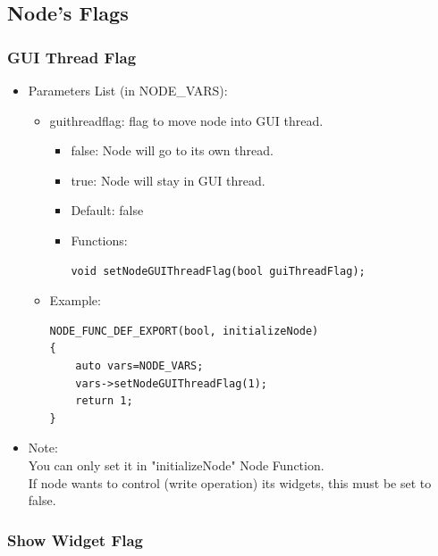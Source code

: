 \documentclass[a4paper,10pt]{book}
\begin{document}
\subsection{Node's Flags}

\subsubsection{GUI Thread Flag}

\begin{mdframed}
\begin{itemize}
 \item Parameters List (in NODE\_VARS):
 \begin{itemize}
  \item guithreadflag: flag to move node into GUI thread.
  \begin{itemize}
   \item false: Node will go to its own thread.
   \item true: Node will stay in GUI thread.
   \item Default: false
   \item Functions:
   \begin{verbatim}
void setNodeGUIThreadFlag(bool guiThreadFlag);
   \end{verbatim}
  \end{itemize}
  \item Example:
  \begin{verbatim}
NODE_FUNC_DEF_EXPORT(bool, initializeNode)
{
    auto vars=NODE_VARS;
    vars->setNodeGUIThreadFlag(1);
    return 1;
}
\end{verbatim}
 \end{itemize}
 \item Note: \\ You can only set it in "initializeNode" Node Function. \\ If node wants to control (write operation) its widgets, this must be set to false.
\end{itemize}
\end{mdframed}

\subsubsection{Show Widget Flag}
\end{document}
